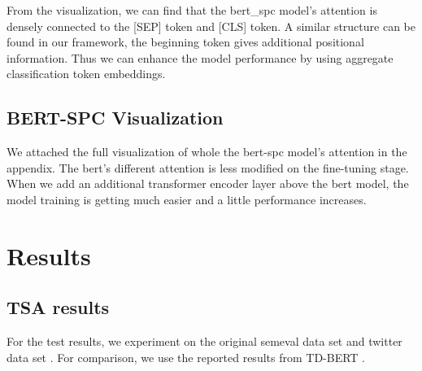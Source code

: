 \documentclass[fyp]{socreport}
\begin{document}
From the visualization, we can find that the bert\_spc model's attention is densely connected to the [SEP] token and [CLS] token. A similar structure can be found in our framework, the beginning token gives additional positional information. Thus we can enhance the model performance by using aggregate classification token embeddings.

\subsection{BERT-SPC Visualization}
We attached the full visualization of whole the bert-spc model's attention in the appendix. The bert's different attention is less modified on the fine-tuning stage. When we add an additional transformer encoder layer above the bert model, the model training is getting much easier and a little performance increases.



\section{Results}
\subsection{TSA results}
For the test results, we experiment on the original semeval \cite{pontiki-etal-2014-semeval} data set and twitter data set \cite{mitchell2013open}. For comparison, we use the reported results from TD-BERT \cite{8864964}.
\end{document}
